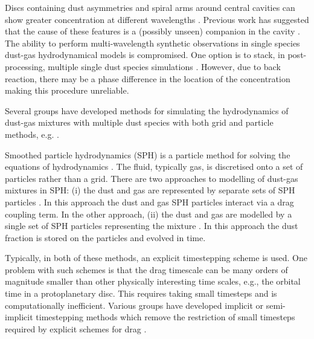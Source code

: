 \documentclass[fleqn,usenatbib]{mnras}
\begin{document}
Discs containing dust asymmetries and spiral arms around central cavities can
show greater concentration at different wavelengths
\citep{Casassus2015ApJ...812..126C, van-der-Marel2015ApJ...810L...7V}.
Previous work has suggested that the cause of these features is a (possibly
unseen) companion in the cavity \citep{Price2018MNRAS.477.1270P,
Poblete2019MNRAS.489.2204P,Calcino2019MNRAS.490.2579C}. The ability to perform
multi-wavelength synthetic observations in single species dust-gas
hydrodynamical models is compromised. One option is to stack, in
post-processing, multiple single dust species simulations
\citep{Dipierro2015MNRAS.453L..73D, Mentiplay2019MNRAS.484L.130M}. However, due
to back reaction, there may be a phase difference in the location of the
concentration making this procedure unreliable.

Several groups have developed methods for simulating the hydrodynamics of
dust-gas mixtures with multiple dust species with both grid and particle
methods, e.g. \citet{Bai2010ApJS..190..297B, Porth2014ApJS..214....4P,
Hutchison2018MNRAS.476.2186H, Benitez-Llambay2019ApJS..241...25B,
Lebreuilly2019A&A...626A..96L, Li2019ApJ...878...39L}.

Smoothed particle hydrodynamics (SPH) is a particle method for solving the
equations of hydrodynamics \citep{Monaghan1992ARA&A..30..543M,
Monaghan2005RPPh...68.1703M, Price2012JCoPh.231..759P}. The fluid, typically
gas, is discretised onto a set of particles rather than a grid. There are two
approaches to modelling of dust-gas mixtures in SPH: (i) the dust and gas are
represented by separate sets of SPH particles
\citep{Monaghan1995CoPhC..87..225M, Laibe2012MNRAS.420.2345L,
Laibe2012MNRAS.420.2365L}. In this approach the dust and gas SPH particles
interact via a drag coupling term. In the other approach, (ii) the dust and gas
are modelled by a single set of SPH particles representing the mixture
\citep{Laibe2014MNRAS.444.1940L, Laibe2014MNRAS.440.2147L,
Laibe2014MNRAS.440.2136L, Price2015MNRAS.451..813P,
Ballabio2018MNRAS.477.2766B}. In this approach the dust fraction is stored on
the particles and evolved in time.

Typically, in both of these methods, an explicit timestepping scheme is used.
One problem with such schemes is that the drag timescale can be many orders of
magnitude smaller than other physically interesting time scales, e.g., the
orbital time in a protoplanetary disc. This requires taking small timesteps and
is computationally inefficient. Various groups have developed implicit or
semi-implicit timestepping methods which remove the restriction of small
timesteps required by explicit schemes for drag
\citep{Monaghan1997JCoPh.138..801M, Laibe2012MNRAS.420.2365L,
Loren-Aguilar2014MNRAS.443..927L, Loren-Aguilar2015MNRAS.454.4114L,
Stoyanovskaya2018A&C....25...25S}.
\end{document}
